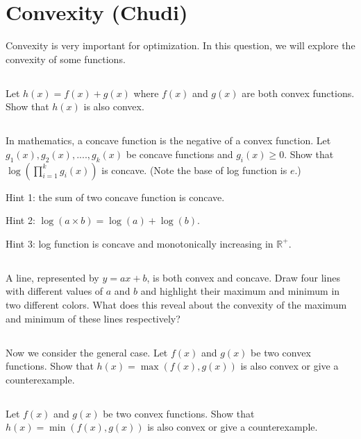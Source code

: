 \documentclass{exam}
\begin{document}
\newpage

\section{Convexity (Chudi)}
Convexity is very important for optimization. In this question, we will explore the convexity of some functions. 


\subsection{}
Let $h(x) = f(x) + g(x)$ where $f(x)$ and $g(x)$ are both convex functions. Show that $h(x)$ is also convex. 

\subsection{}
In mathematics, a concave function is the negative of a convex function. Let $g_1(x), g_2(x), ...., g_k(x)$ be concave functions and $g_i(x) \geq 0$. Show that $\log (\prod_{i=1}^k g_i(x))$ is concave. (Note the base of log function is $e$.)

\noindent Hint 1: the sum of two concave function is concave.

\noindent Hint 2: $\log(a \times b) = \log (a) + \log(b)$.

\noindent Hint 3: log function is concave and monotonically increasing in $\mathbb{R}^+$.

 

 
\subsection{}
A line, represented by $y = ax+b$, is both convex and concave. Draw four lines with different values of $a$ and $b$ and highlight their maximum and minimum in two different colors. 
What does this reveal about the convexity of the maximum and minimum of these lines respectively? 

\subsection{}
Now we consider the general case. Let $f(x)$ and $g(x)$ be two convex functions. Show that $h(x) = \max(f(x), g(x))$ is also convex or give a counterexample.

\subsection{}
Let $f(x)$ and $g(x)$ be two convex functions. Show that $h(x) = \min(f(x), g(x))$ is also convex or give a counterexample.
\end{document}
